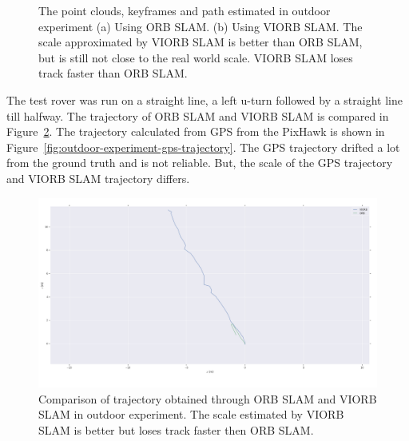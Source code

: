 \begin{figure}[h]
	
	\centering
	\caption[Outdoor experiment.]{\small 
		The point clouds, keyframes and path estimated in outdoor experiment (a) Using ORB SLAM. (b) Using VIORB SLAM. The scale approximated by VIORB SLAM is better than ORB SLAM, but is still not close to the real world scale. VIORB SLAM loses track faster than ORB SLAM. }
	\label{fig:outdoor-path-visualization}
	
\end{figure}

The test rover was run on a straight line, a left u-turn followed by a straight line till halfway.
The trajectory of ORB SLAM and VIORB SLAM is compared in Figure~\ref{fig:outdoor-experiment-trajectory}. The trajectory calculated from GPS from the PixHawk is shown in  Figure~\ref{fig:outdoor-experiment-gps-trajectory}. The GPS trajectory drifted a lot from the ground truth and is not reliable. But, the scale of the GPS trajectory and VIORB SLAM trajectory differs.

\begin{figure}[h]
	\centering
	\includegraphics[width=5.5in]{figures/demo3_trajectory}
	\caption[Outdoor experiment trajectory]{\small 
		Comparison of trajectory obtained through ORB SLAM and VIORB SLAM in outdoor experiment. The scale estimated by VIORB SLAM is better but loses track faster then ORB SLAM. }
	\label{fig:outdoor-experiment-trajectory}
\end{figure}

